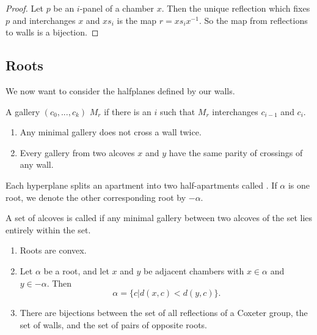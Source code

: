 \documentclass[11pt]{article}
\begin{document}
\begin{proof}
    Let $p$ be an $i$-panel of a chamber $x$. Then the unique reflection which fixes $p$ and interchanges $x$ and $xs_i$ is the map $r=xs_ix^{-1}$. So the map from reflections to walls is a bijection.
\end{proof}



\subsection{Roots}

We now want to consider the halfplanes defined by our walls.

\begin{definition}
    A gallery $(c_0,...,c_k)$  $M_r$ if there is an $i$ such that $M_r$ interchanges $c_{i-1}$ and $c_i$. 
\end{definition}

\begin{lemma}
    \begin{enumerate}
        \item Any minimal gallery does not cross a wall twice.
        \item Every gallery from two alcoves $x$ and $y$ have the same parity of crossings of any wall.
    \end{enumerate}
\end{lemma}


\begin{definition}
    Each hyperplane splits an apartment into two half-apartments called . If $\alpha$ is one root, we denote the other corresponding root by $-\alpha$. 
\end{definition}


\begin{definition}
    A set of alcoves is called  if any minimal gallery between two alcoves of the set lies entirely within the set. 
\end{definition}

\begin{proposition}
    \begin{enumerate}
        \item Roots are convex.
        \item Let $\alpha$ be a root, and let $x$ and $y$ be adjacent chambers with $x\in\alpha$ and $y\in -\alpha$. Then
        \[\alpha =\{c|d(x,c)<d(y,c)\}.\]
        \item There are bijections between the set of all reflections of a Coxeter group, the set of walls, and the set of pairs of opposite roots.
    \end{enumerate}
\end{proposition}
\end{document}
